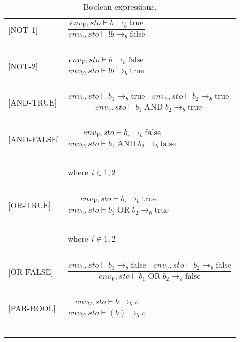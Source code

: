 \begin{longtable}{l l}
[NOT-1] & $\dfrac{env_V, sto \vdash b \rightarrow_b \text{true}}{env_V, sto \vdash !b \rightarrow_b \text{false}}$ \\
~ & ~ \\

[NOT-2] & $\dfrac{env_V, sto \vdash b \rightarrow_b \text{false}}{env_V, sto \vdash !b \rightarrow_b \text{true}}$ \\
~ & ~ \\

[AND-TRUE] & $\dfrac{env_V, sto \vdash b_1 \rightarrow_b \text{true} \; \; \; env_V, sto \vdash b_2 \rightarrow_b \text{true}}{env_V, sto \vdash b_1 \; \text{AND} \; b_2 \rightarrow_b \text{true}}$ \\
~ & ~ \\

[AND-FALSE] & $\dfrac{env_V, sto \vdash b_i \rightarrow_b \text{false}}{env_V, sto \vdash b_1 \; \text{AND} \; b_2 \rightarrow_b \text{false}}$ \\
~ & ~ \\
~ & \indent\indent where $i \in {1,2}$ \\
~ & ~ \\

[OR-TRUE] & $\dfrac{env_V, sto \vdash b_i \rightarrow_b \text{true}}{env_V, sto \vdash b_1 \; \text{OR} \; b_2 \rightarrow_b \text{true}}$ \\
~ & ~ \\
~ & \indent\indent where $i \in {1,2}$ \\
~ & ~ \\

[OR-FALSE] & $\dfrac{env_V, sto \vdash b_1 \rightarrow_b \text{false} \; \; \; env_V, sto \vdash b_2 \rightarrow_b \text{false}}{env_V, sto \vdash b_1 \; \text{OR} \; b_2 \rightarrow_b \text{false}}$ \\
~ & ~ \\

[PAR-BOOL] & $\dfrac{env_V, sto \vdash b \rightarrow_b v}{env_V, sto \vdash (b) \rightarrow_b v}$ \\
~ & ~ \\
\caption{Boolean expressions.}
\end{longtable}

